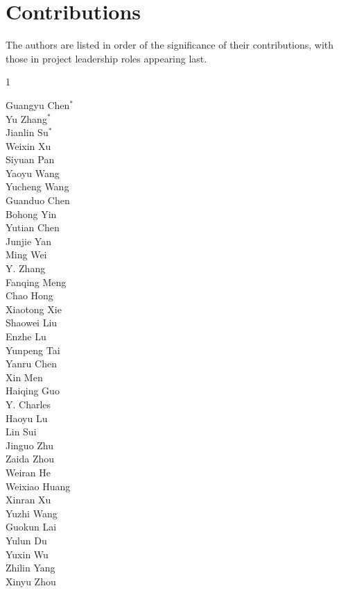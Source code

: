 \newpage
\printbibliography[title={References}]

\newpage
\appendix
\section{Contributions}

The authors are listed in order of the significance of their contributions, with those in project leadership roles appearing last. 


\begin{multicols}{1}

Guangyu Chen$^*$\\
Yu Zhang$^*$\\
Jianlin Su$^*$\\
Weixin Xu\\
Siyuan Pan\\
Yaoyu Wang\\
Yucheng Wang\\
Guanduo Chen\\
Bohong Yin\\
Yutian Chen\\
Junjie Yan\\
Ming Wei\\
Y. Zhang\\
Fanqing Meng\\
Chao Hong\\
Xiaotong Xie\\
Shaowei Liu\\
Enzhe Lu\\
Yunpeng Tai\\
Yanru Chen\\
Xin Men\\
Haiqing Guo\\
Y. Charles\\
Haoyu Lu\\
Lin Sui\\
Jinguo Zhu\\
Zaida Zhou\\
Weiran He\\
Weixiao Huang\\
Xinran Xu\\
Yuzhi Wang\\
Guokun Lai\\
Yulun Du\\
Yuxin Wu\\
Zhilin Yang\\
Xinyu Zhou\\

\end{multicols}

